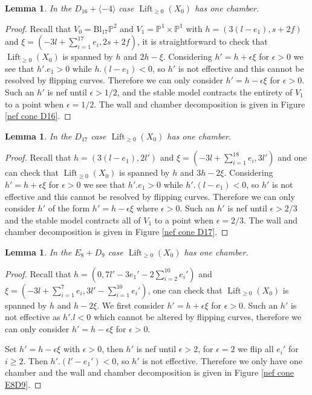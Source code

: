 \documentclass[a4paper]{amsart}
\theoremstyle{definition}
\theoremstyle{plain}
\newtheorem{lemma}[defn]{Lemma}
\theoremstyle{remark}
\newcommand{\PS}{\mathbb{P}}
\begin{document}
\begin{lemma}
In the $D_{16}+\langle -4\rangle$ case $\operatorname{Lift}_{\geq 0}(X_0)$ has one chamber.
\end{lemma}

\begin{proof}
Recall that $V_0 = \operatorname{Bl_{17}\PS^2}$ and $V_1=\PS^1\times\PS^1$ with $h=(3(l-e_1),s+2f)$ and $\xi=(-3l+\sum_{i=1}^{17}e_i,2s+2f)$, it is straightforward to check that $\operatorname{Lift}_{\geq 0}(X_0)$ is spanned by $h$ and $2h-\xi$. Considering $h'=h+\epsilon\xi$ for $\epsilon > 0$ we see that $h'.e_1>0$ while $h.(l-e_1)<0$, so $h'$ is not effective and this cannot be resolved by flipping curves. Therefore we can only consider $h'=h-\epsilon\xi$ for $\epsilon >0$. Such an $h'$ is nef until $\epsilon >1/2$, and the stable model contracts the entirety of $V_1$ to a point when $\epsilon =1/2$. The wall and chamber decomposition is given in Figure \ref{nef cone D16}.
\end{proof}

\begin{lemma}
In the $D_{17}$ case $\operatorname{Lift}_{\geq 0}(X_0)$ has one chamber.
\end{lemma}

\begin{proof}
Recall that $h=(3(l-e_1),2l')$ and $\xi=(-3l+\sum_{i=1}^{18}e_i,3l')$ and one can check that $\operatorname{Lift}_{\geq 0}(X_0)$ is spanned by $h$ and $3h-2\xi$. Considering $h'=h+\epsilon\xi$ for $\epsilon >0$ we see that $h'. e_1>0$ while $h'.(l-e_1)<0$, so $h'$ is not effective and this cannot be resolved by flipping curves. Therefore we can only consider $h'$ of the form $h'=h-\epsilon\xi$ where $\epsilon >0$. Such an $h'$ is nef until $\epsilon >2/3$ and the stable model contracts all of $V_1$ to a point when $\epsilon =2/3$. The wall and chamber decomposition is given in Figure \ref{nef cone D17}.
\end{proof}

\begin{lemma}
In the $E_8+D_9$ case $\operatorname{Lift}_{\geq 0}(X_0)$ has one chamber.
\end{lemma}

\begin{proof}
Recall that $h=(0,7l'-3e_1'-2\sum_{i=2}^{10}e_i')$ and $\xi=(-3l+\sum_{i=1}^7e_i,3l'-\sum_{i=1}^{10}e_i')$, one can check that $\operatorname{Lift}_{\geq 0}(X_0)$ is spanned by $h$ and $h-2\xi$. We first consider $h' = h+\epsilon\xi$ for $\epsilon >0$. Such an $h'$ is not effective as $h'. l<0$ which cannot be altered by flipping curves, therefore we can only consider $h'=h-\epsilon\xi$ for $\epsilon >0$.

Set $h'=h-\epsilon\xi$ with $\epsilon >0$, then $h'$ is nef until $\epsilon > 2$, for $\epsilon = 2$ we flip all $e_i'$ for $i\geq 2$. Then $h'.(l'-e_1')<0$, so $h'$ is not effective. Therefore we only have one chamber and the wall and chamber decomposition is given in Figure \ref{nef cone E8D9}.
\end{proof}
\end{document}
